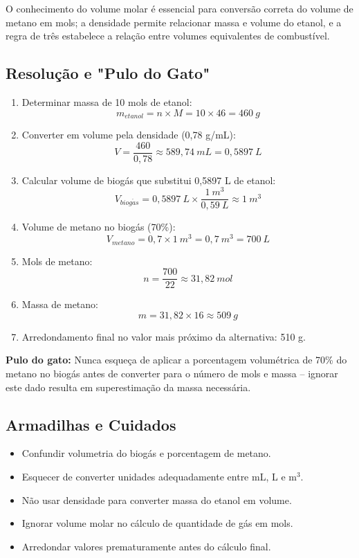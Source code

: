\documentclass{article}
\begin{document}
\medskip

O conhecimento do volume molar é essencial para conversão correta do volume de metano em mols; a densidade permite relacionar massa e volume do etanol, e a regra de três estabelece a relação entre volumes equivalentes de combustível.

\subsection*{Resolução e "Pulo do Gato"}

\begin{enumerate}
  \item Determinar massa de 10 mols de etanol:
  \[
    m_{etanol} = n \times M = 10 \times 46 = 460\ g
  \]
  
  \item Converter em volume pela densidade (0,78 g/mL):
  \[
    V = \frac{460}{0,78} \approx 589,74\ mL = 0,5897\ L
  \]
  
  \item Calcular volume de biogás que substitui 0,5897 L de etanol:
  \[
    V_{biog\acute{a}s} = 0,5897\ L \times \frac{1\ m^{3}}{0,59\ L} \approx 1\ m^{3}
  \]
  
  \item Volume de metano no biogás (70\%):
  \[
    V_{metano} = 0,7 \times 1\ m^{3} = 0,7\ m^{3} = 700\ L
  \]
  
  \item Mols de metano:
  \[
    n = \frac{700}{22} \approx 31,82\ mol
  \]
  
  \item Massa de metano:
  \[
    m = 31,82 \times 16 \approx 509\ g
  \]

\item Arredondamento final no valor mais próximo da alternativa: 510 g.
\end{enumerate}

\textbf{Pulo do gato:} Nunca esqueça de aplicar a porcentagem volumétrica de 70\% do metano no biogás antes de converter para o número de mols e massa – ignorar este dado resulta em superestimação da massa necessária.

\subsection*{Armadilhas e Cuidados}

\begin{itemize}
  \item Confundir volumetria do biogás e porcentagem de metano.
  \item Esquecer de converter unidades adequadamente entre mL, L e m$^{3}$.
  \item Não usar densidade para converter massa do etanol em volume.
  \item Ignorar volume molar no cálculo de quantidade de gás em mols.
  \item Arredondar valores prematuramente antes do cálculo final.
\end{itemize}
\end{document}
